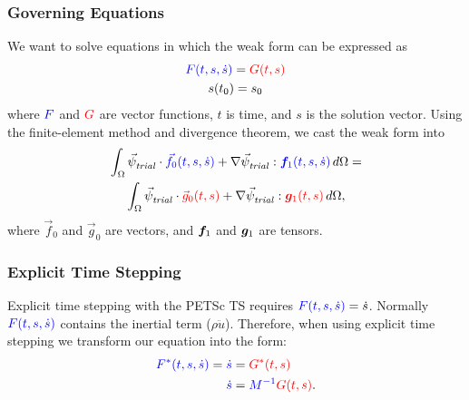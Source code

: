 \documentclass[aspectratio=169,hyperref=colorlinks]{beamer}
\begin{document}
\begin{frame}
  \frametitle{Governing Equations}
  \summary{}

  We want to solve equations in which the weak form can be expressed
  as
  \begin{gather}
    {\color{blue}F(t,s,\dot{s})} = {\color{red}G(t,s)} \\
    s(t_0) = s_0
  \end{gather}
  where ${\color{blue}F}$ and ${\color{red}G}$ are vector functions, $t$ is time, and $s$ is the solution vector.
  \vfill
  Using the finite-element method and divergence theorem, we cast the weak form into
  \begin{multline}
    \int_\Omega {\vec{\psi}_\mathit{trial}^{}} \cdot {\color{blue}\vec{f}_0(t,s,\dot{s})} + \nabla {\vec{\psi}_\mathit{trial}^{}} : {\color{blue}\bm{f}
    _1(t,s,\dot{s})} \, 
    d\Omega = \\
    \int_\Omega {\vec{\psi}_\mathit{trial}^{}} \cdot {\color{red}\vec{g}_0(t,s)} + \nabla {\vec{\psi}_\mathit{trial}^{}} : {\color{red}\bm{g}_1(t,s)} \, 
    d\Omega,
  \end{multline}
  where $\vec{f}_0$ and $\vec{g}_0$ are vectors, and $\bm{f}_1$ and
  $\bm{g}_1$ are tensors.

\end{frame}

\begin{frame}
  \frametitle{Explicit Time Stepping}
  \summary{}

  Explicit time stepping with the PETSc TS requires ${\color{blue}F(t,s,\dot{s})} = \dot{s}$.
  \vfill
  Normally ${\color{blue}F(t,s,\dot{s})}$ contains the inertial term ($\rho \ddot{u}$).
  \vfill
  Therefore, when using explicit time stepping we transform our equation into the form:
  \begin{align}
    {\color{blue}F^*(t,s,\dot{s})} = {\color{blue}\dot{s}} &= {\color{red}G^*(t,s)} \\
    {\color{blue}\dot{s}} &= {\color{blue}M^{-1}}{\color{red}G(t,s)}.
  \end{align}  

\end{frame}
\end{document}
